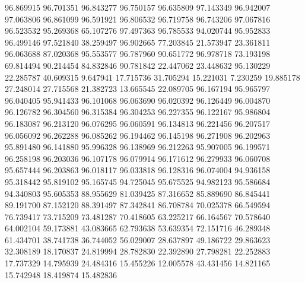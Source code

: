 96.869915
96.701351
96.843277
96.750157
96.635809
97.143349
96.942007
97.063806
96.861099
96.591921
96.806532
96.719758
96.743206
97.067816
96.523532
95.269368
65.107276
97.497363
96.785533
94.020744
95.952833
96.499146
97.521840
38.259497
96.902665
77.203845
21.573947
23.361811
96.063688
87.020368
95.553577
96.787960
90.651772
96.978718
73.193198
69.814494
90.214454
84.832846
90.781842
22.447062
23.448632
95.130229
22.285787
40.609315
9.647941
17.715736
31.705294
15.221031
7.230259
19.885178
27.248014
27.715568
21.382723
13.665545
22.089705
96.167194
95.965797
96.040405
95.941433
96.101068
96.063690
96.020392
96.126449
96.004870
96.126782
96.304560
96.315384
96.304253
96.227355
96.122167
95.986804
96.183087
96.213120
96.076295
96.060591
96.134813
96.221456
96.207517
96.056092
96.262288
96.085262
96.194462
96.145198
96.271908
96.202963
95.891480
96.141880
95.996328
96.138969
96.212263
95.907005
96.199571
96.258198
96.203036
96.107178
96.079914
96.171612
96.279933
96.060708
95.657444
96.203863
96.018117
96.033818
96.128316
96.074004
94.936158
95.318442
95.819102
95.165745
94.725045
95.675525
94.982123
95.586684
94.340803
95.605353
88.955629
81.039425
87.316652
85.889690
86.845441
89.191700
87.152120
88.391497
87.342841
86.708784
70.025378
66.549594
76.739417
73.715209
73.481287
70.418605
63.225217
66.164567
70.578640
64.002104
59.173881
43.083665
62.793638
53.639354
72.151716
46.289348
61.434701
38.741738
36.744052
56.029007
28.637897
49.186722
29.863623
32.308189
18.170837
24.819994
28.782830
22.392890
27.798281
22.252883
17.737329
14.795939
24.484316
15.455226
12.005578
43.431456
14.821165
15.742948
18.419874
15.482836
